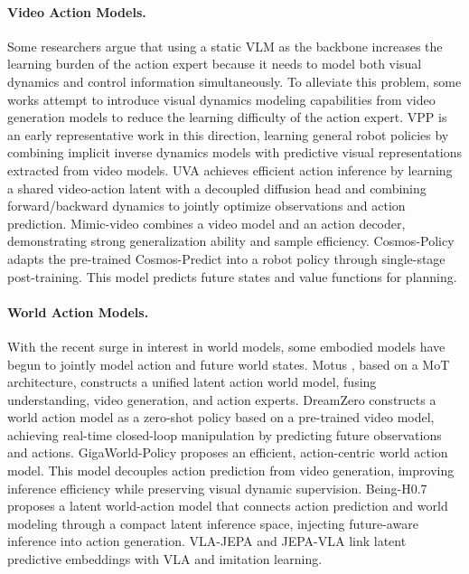 \documentclass{llmxive}
\begin{document}
\paragraph{Video Action Models.}\label{sec:vams}
Some researchers argue that using a static VLM as the backbone increases the learning burden of the action expert because it needs to model both visual dynamics and control information simultaneously. To alleviate this problem, some works attempt to introduce visual dynamics modeling capabilities from video generation models to reduce the learning difficulty of the action expert. VPP \citep{VPP} is an early representative work in this direction, learning general robot policies by combining implicit inverse dynamics models with predictive visual representations extracted from video models. UVA \citep{UVA} achieves efficient action inference by learning a shared video-action latent with a decoupled diffusion head and combining forward/backward dynamics to jointly optimize observations and action prediction. Mimic-video \citep{mimic-video} combines a video model and an action decoder, demonstrating strong generalization ability and sample efficiency. Cosmos-Policy \citep{cosmos-policy} adapts the pre-trained Cosmos-Predict \citep{cosmospredict2.5} into a robot policy through single-stage post-training. This model predicts future states and value functions for planning.



\vspace{-0.5em}
\paragraph{World Action Models.}\label{sec:wams}
With the recent surge in interest in world models, some embodied models have begun to jointly model action and future world states. Motus \citep{motus}, based on a MoT architecture, constructs a unified latent action world model, fusing understanding, video generation, and action experts. DreamZero \citep{DreamZero} constructs a world action model as a zero-shot policy based on a pre-trained video model, achieving real-time closed-loop manipulation by predicting future observations and actions. GigaWorld-Policy \citep{GigaWorld-Policy} proposes an efficient, action-centric world action model. This model decouples action prediction from video generation, improving inference efficiency while preserving visual dynamic supervision. Being-H0.7 \citep{Being-H0.7} proposes a latent world-action model that connects action prediction and world modeling through a compact latent inference space, injecting future-aware inference into action generation. VLA-JEPA \citep{VLA-JEPA} and JEPA-VLA \citep{JEPA-VLA} link latent predictive embeddings with VLA and imitation learning.
\end{document}
